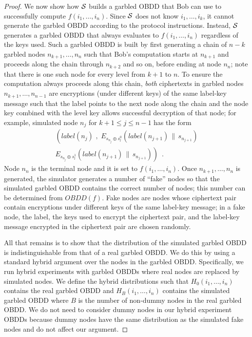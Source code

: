 \begin{proof}
We now show how ${\mathcal{S}}$ builds a garbled OBDD that Bob can use to
successfully compute $f(i_1,\ldots,i_n)$. Since ${\mathcal{S}}$ does not know
$i_1,\ldots,i_k$, it cannot generate the garbled OBDD according to the
protocol instructions. Instead, ${\mathcal{S}}$ generates a garbled OBDD that
always evaluates to $f(i_1,\ldots,i_n)$ regardless of the keys
used. Such a garbled OBDD is built by first generating a chain of $n-k$
garbled nodes $n_{k+1},\ldots,n_{n}$ such that Bob's computation
starts at  $n_{k+1}$ and proceeds along the chain through
$n_{k+2}$ and so on, before ending at node $n_{n}$; note that there is
one such node for every level from $k+1$ to $n$. To ensure the
computation always proceeds along this chain, \textit{both}
ciphertexts in garbled nodes $n_{k+1},\ldots,n_{n-1}$ are encryptions
(under different keys) of the same label-key message such that the
label points to the next node along the chain and the node key
combined with the level key allows successful decryption of that node;
for example, simulated node $n_j$ for $k+1 \leq j\leq n-1$ has the
form
\[
\begin{array}{l}
\left( label(n_j)\,\,,\,\,E_{s_{n_j} \oplus s_{l}^0} (label(n_{j+1}) \,\|\, s_{n_{j+1}}) \right. \\
\left. E_{s_{n_j} \oplus s_{l}^1} (label(n_{j+1}) \,\|\, s_{n_{j+1}})\right)\,\,\,.
\end{array}
\]
Node $n_{n}$ is the terminal node and it is set to
$f(i_1,\ldots,i_n)$. Once $n_{k+1},\ldots,n_{n}$ is generated, the
simulator generates a number of ``fake'' nodes so that the simulated
garbled OBDD contains the correct number of nodes; this number can be
determined from $OBDD(f)$. Fake nodes are nodes whose ciphertext pair
contain encryptions under different keys of the same label-key
message; in a fake node, the label, the keys used to encrypt the
ciphertext pair, and the label-key message encrypted in the ciphertext
pair are chosen randomly.

All that remains is to show that the distribution of the simulated
garbled OBDD is indistinguishable from that of a real garbled OBDD. We
do this by using a standard hybrid argument over the nodes in the
garbled OBDD. Specifically, we run hybrid experiments with garbled OBDDs
where real nodes are replaced by simulated nodes. We define the hybrid
distributions such that $H_0(i_1,\ldots,i_n)$ contains the real
garbled OBDD and $H_{B}(i_1,\ldots,i_n)$ contains the simulated garbled
OBDD where $B$ is the number of non-dummy nodes in the real garbled
OBDD. We do not need to consider dummy nodes in our hybrid experiment
OBDDs because dummy nodes have the same distribution as the simulated
fake nodes and do not affect our argument.


\end{proof}
